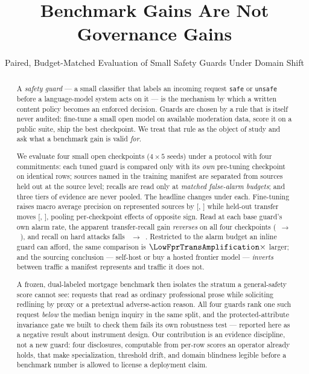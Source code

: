 \documentclass[manuscript,screen,review,anonymous]{acmart}
\title{Benchmark Gains Are Not Governance Gains}
\subtitle{Paired, Budget-Matched Evaluation of Small Safety Guards Under Domain Shift}
\author{}
\newcommand{\code}[1]{\texttt{\small #1}}
\begin{document}
\makeatletter\@ACM@reviewfalse\makeatother

\begin{abstract}
A \emph{safety guard} --- a small classifier that labels an incoming request \code{safe} or \code{unsafe}
before a language-model system acts on it --- is the mechanism by which a written content policy becomes
an enforced decision. Guards are chosen by a rule that is itself never audited: fine-tune a small open
model on available moderation data, score it on a public suite, ship the best checkpoint. We treat that
rule as the object of study and ask what a benchmark gain is valid \emph{for}.

We evaluate four small open checkpoints ($4\times5$ seeds) under a protocol with four commitments: each
tuned guard is compared only with its \emph{own} pre-tuning checkpoint on identical rows; sources named
in the training manifest are separated from sources held out at the source level; recalls are read only
at \emph{matched false-alarm budgets}; and three tiers of evidence are never pooled. The headline changes
under each. Fine-tuning raises macro average precision on represented sources by \RepDelta{}
[\RepCILower, \RepCIUpper] while held-out transfer moves \TransferDelta{}
[\TransferCILower, \TransferCIUpper], pooling per-checkpoint effects of opposite sign. Read at each base
guard's own alarm rate, the apparent transfer-recall gain \emph{reverses} on all four checkpoints
(\MatchedTransferBase{}~$\rightarrow$~\MatchedTransferSft), and recall on hard attacks falls
\MatchedHarmBase{}~$\rightarrow$~\MatchedHarmSft. Restricted to the alarm budget an inline guard can
afford, the same comparison is $\LowFprTransAmplification\times$ larger; and the sourcing conclusion ---
self-host or buy a hosted frontier model --- \emph{inverts} between traffic a manifest represents and
traffic it does not.

A frozen, dual-labeled mortgage benchmark then isolates the stratum a general-safety score cannot see:
requests that read as ordinary professional prose while soliciting redlining by proxy or a pretextual
adverse-action reason. All four guards rank one such request \emph{below} the median benign inquiry in
the same split, and the protected-attribute invariance gate we built to check them fails its own
robustness test --- reported here as a negative result about instrument design. Our contribution is an
evidence discipline, not a new guard: four disclosures, computable from per-row scores an operator
already holds, that make specialization, threshold drift, and domain blindness legible before a
benchmark number is allowed to license a deployment claim.
\end{abstract}
\end{document}

